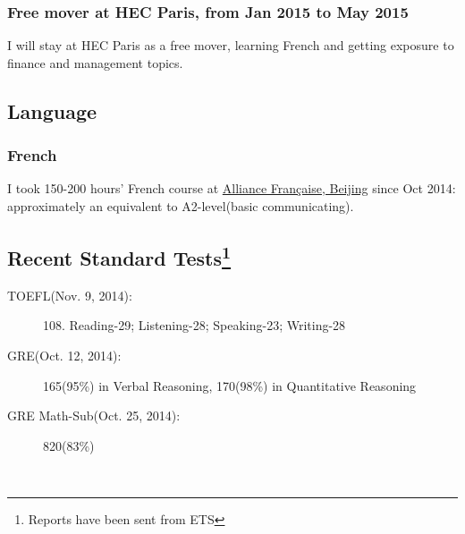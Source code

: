\documentclass{article}
\begin{document}
\subsubsection{Free mover at HEC Paris, from Jan 2015 to May 2015}
I will stay at HEC Paris as a free mover, learning French and getting exposure to finance and management topics.
\quad\\

\subsection{Language}
\subsubsection{French}
I took 150-200 hours' French course at \href{http://www.alliancefr.org/}{Alliance Française, Beijing} since Oct 2014: approximately an equivalent to A2-level(basic communicating).
\quad\\
\subsection{Recent Standard Tests\protect\footnote{Reports have been sent from ETS}}
\begin{description}
\item[TOEFL(Nov. 9, 2014):] 108. Reading-29; Listening-28; Speaking-23; Writing-28
\item[GRE(Oct. 12, 2014):] 165(95\%) in Verbal Reasoning, 170(98\%) in Quantitative Reasoning
\item[GRE Math-Sub(Oct. 25, 2014):] 820(83\%)
\end{description}
% 
\quad\\
\end{document}
